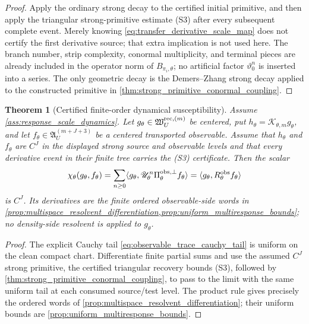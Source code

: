 \documentclass[11pt]{amsart}
\theoremstyle{compactplain}
\newtheorem{theorem}{Theorem}[section]
\theoremstyle{compactdefinition}
\theoremstyle{compactremark}
\newcommand{\Piobsperp}{\Pi^{\mathrm{obs},\perp}}
\begin{document}
\begin{proof}
Apply the ordinary strong decay to the certified initial primitive, and then
apply the triangular strong-primitive estimate (S3) after every subsequent
complete event.  Merely knowing
\eqref{eq:transfer_derivative_scale_map} does not certify the first derivative
source; that extra implication is not used here.  The
branch number, strip complexity, conormal multiplicity, and terminal pieces
are already included in the operator norm of \(B_{\pi_i,\theta}\); no
artificial factor \(\vartheta_0^n\) is inserted into a series.  The only
  geometric decay is the Demers--Zhang strong decay applied to the constructed
  primitive in \cref{thm:strong_primitive_conormal_coupling}.
\end{proof}

\begin{theorem}[Certified finite-order dynamical susceptibility]
\label{thm:finite_order_dynamical_susceptibility}
Assume \cref{ass:response_scale_dynamics}.  Let
\(g_\theta\in\mathfrak W_U^{{\rm rec},(m)}\) be centered, put
\(h_\theta=\mathcal K_{\theta,m}g_\theta\), and let
\(f_\theta\in\mathfrak A_U^{(m+J+3)}\) be a centered transported observable.
Assume that \(h_\theta\) and \(f_\theta\) are \(C^J\) in the displayed strong
source and observable levels and that every derivative event in their finite
tree carries the (S3) certificate.  Then the scalar
\begin{equation}
\label{eq:dynamical_susceptibility}
 \chi_\theta(g_\theta,f_\theta)
 =\sum_{n\ge0}\langle g_\theta,
   \mathscr U_\theta^n\Piobsperp_\theta f_\theta\rangle
 =\langle g_\theta,R_\theta^{\rm obs}f_\theta\rangle
\end{equation}
is \(C^J\).  Its derivatives are the finite ordered observable-side words in
\cref{prop:multispace_resolvent_differentiation,prop:uniform_multiresponse_bounds};
no density-side resolvent is applied to \(g_\theta\).
\end{theorem}

\begin{proof}
The explicit Cauchy tail
\eqref{eq:observable_trace_cauchy_tail} is uniform on the clean compact chart.
Differentiate finite partial sums and use the assumed \(C^J\) strong primitive,
the certified triangular recovery bounds (S3), followed by
\cref{thm:strong_primitive_conormal_coupling}, to pass to the limit with the same uniform tail
at each consumed source/test level.  The product rule gives precisely
the ordered words of
\cref{prop:multispace_resolvent_differentiation}; their uniform bounds are
\cref{prop:uniform_multiresponse_bounds}.
\end{proof}
\end{document}
